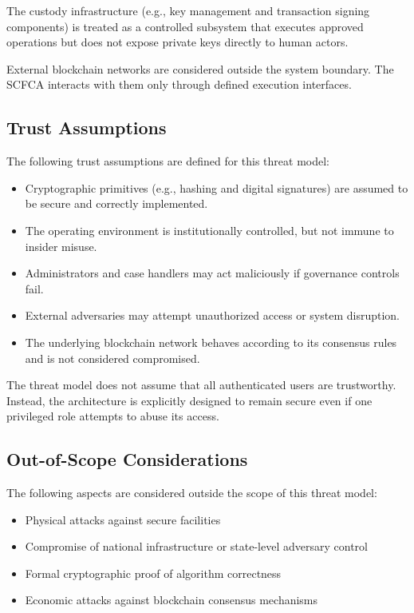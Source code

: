 \documentclass[12pt,a4paper]{report}
\begin{document}
The custody infrastructure (e.g., key management and transaction signing components) is treated as a controlled subsystem that executes approved operations but does not expose private keys directly to human actors.

External blockchain networks are considered outside the system boundary. The SCFCA interacts with them only through defined execution interfaces.

\subsection{Trust Assumptions}

The following trust assumptions are defined for this threat model:

\begin{itemize}
    \item Cryptographic primitives (e.g., hashing and digital signatures) are assumed to be secure and correctly implemented.
    \item The operating environment is institutionally controlled, but not immune to insider misuse.
    \item Administrators and case handlers may act maliciously if governance controls fail.
    \item External adversaries may attempt unauthorized access or system disruption.
    \item The underlying blockchain network behaves according to its consensus rules and is not considered compromised.
\end{itemize}

The threat model does not assume that all authenticated users are trustworthy. Instead, the architecture is explicitly designed to remain secure even if one privileged role attempts to abuse its access.

\subsection{Out-of-Scope Considerations}

The following aspects are considered outside the scope of this threat model:

\begin{itemize}
    \item Physical attacks against secure facilities
    \item Compromise of national infrastructure or state-level adversary control
    \item Formal cryptographic proof of algorithm correctness
    \item Economic attacks against blockchain consensus mechanisms
\end{itemize}
\end{document}
